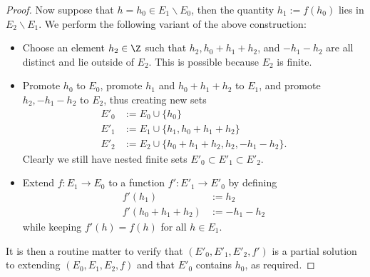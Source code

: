 \begin{proof}
Now suppose that $h = h_0 \in E_1 \backslash E_0$, then the quantity $h_1 := f(h_0)$ lies in $E_2 \backslash E_1$.  We perform the following variant of the above construction:
\begin{itemize}
\item Choose an element $h_2 \in \Z$ such that $h_2, h_0+h_1+h_2$, and $-h_1-h_2$ are all distinct and lie outside of $E_2$.  This is possible because $E_2$ is finite.
\item Promote $h_0$ to $E_0$, promote $h_1$ and $h_0+h_1+h_2$ to $E_1$, and promote $h_2, -h_1-h_2$ to $E_2$, thus creating new sets
\begin{align*}
  E'_0 &:= E_0 \cup \{h_0\} \\
  E'_1 &:= E_1 \cup \{h_1, h_0+h_1+h_2\} \\
  E'_2 &:= E_2 \cup \{h_0+h_1+h_2, h_2, -h_1-h_2\}.
\end{align*}
Clearly we still have nested finite sets $E'_0 \subset E'_1 \subset E'_2$.
\item Extend $f : E_1 \to E_0$ to a function $f': E'_1 \to E'_0$ by defining
\begin{align*}
  f'(h_1) &:= h_2 \\
  f'(h_0+h_1+h_2) &:= -h_1-h_2
\end{align*}
while keeping $f'(h)=f(h)$ for all $h \in E_1$.
\end{itemize}
It is then a routine matter to verify that $(E'_0,E'_1,E'_2,f')$ is a partial solution to  extending $(E_0,E_1,E_2,f)$ and that $E'_0$ contains $h_0$, as required.


\end{proof}
